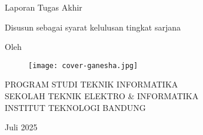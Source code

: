 \clearpage
\pagestyle{empty}

\begin{center}
	\smallskip

	\Large \bfseries \MakeUppercase{\thetitle}
	\vfill

	\Large Laporan Tugas Akhir
	\vfill

	\large Disusun sebagai syarat kelulusan tingkat sarjana
	\vfill

	\large Oleh

	\Large \theauthor

	\vfill
	\begin{figure}[ht]
		\centering
		\texttt{[image: cover-ganesha.jpg]}
	\end{figure}
	\vfill

	\large
	\uppercase{
		Program Studi Teknik Informatika \\
		Sekolah Teknik Elektro \& Informatika \\
		Institut Teknologi Bandung
	}

	Juli 2025

\end{center}

\clearpage
